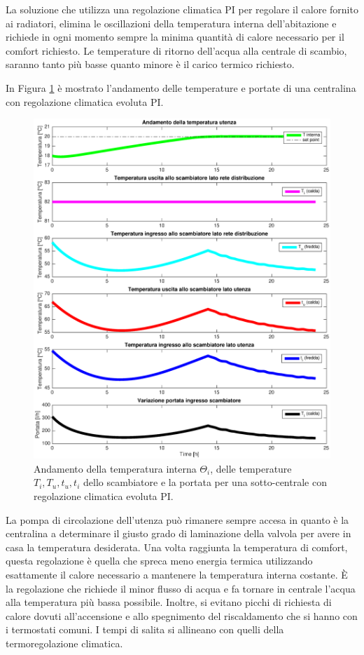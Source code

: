\documentclass[laurea,oneside,11pt]{USiena_tesiLM3}
\begin{document}

La soluzione che utilizza una regolazione climatica PI per regolare il calore fornito ai radiatori, elimina le oscillazioni della temperatura interna dell'abitazione e richiede in ogni momento sempre la minima quantità di calore necessario per il comfort richiesto. Le temperature di ritorno dell'acqua alla centrale di scambio, saranno tanto più basse quanto minore è il carico termico richiesto. 

In Figura \ref{fig:reg_PID} è mostrato l'andamento delle temperature e portate di una centralina con regolazione climatica evoluta PI.

\begin{figure}[!ht]
\centering
\includegraphics[width=\textwidth]{figure/reg_PID} 
\caption{Andamento della temperatura interna $\Theta_i$, delle temperature $T_i, T_u, t_u, t_i$ dello scambiatore e la portata per una sotto-centrale con regolazione climatica evoluta PI.}
\label{fig:reg_PID}
\end{figure}

La pompa di circolazione dell'utenza può rimanere sempre accesa in quanto è la centralina a determinare il giusto grado di laminazione della valvola per avere in casa la temperatura desiderata. 
 Una volta raggiunta la temperatura di comfort, questa regolazione è quella che spreca meno energia termica utilizzando esattamente il calore necessario a mantenere la temperatura interna costante. È la regolazione che richiede il minor flusso di acqua e fa tornare in centrale l'acqua alla temperatura più bassa possibile.  Inoltre, si evitano picchi di richiesta di calore dovuti all'accensione e allo spegnimento del riscaldamento che si hanno con i termostati comuni. I tempi di salita si allineano con quelli della termoregolazione climatica.
\end{document}

